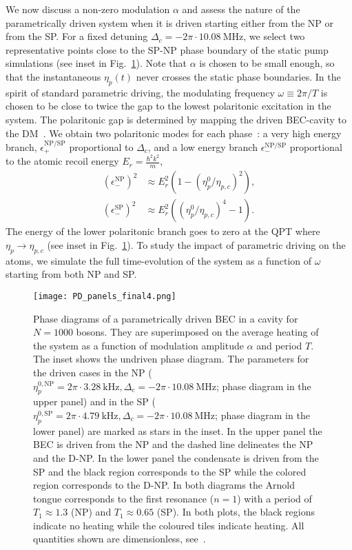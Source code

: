 \documentclass[aps,prl,twocolumn,superscriptaddress,groupedaddress]{revtex4}  %
\begin{document}
We now discuss a non-zero modulation $\alpha$ and assess the nature of the parametrically driven system when it is driven starting either from the NP or from the SP.
For a fixed detuning $\Delta_c=- 2\pi \cdot 10.08 \: \text{MHz}$, we select two representative points close to the SP-NP phase boundary of the static pump simulations (see inset in Fig.~\ref{PDs}). 
Note that $\alpha$ is chosen to be small enough, so that the instantaneous $\eta_p(t)$ never  crosses the  static phase boundaries.  In the spirit of standard parametric driving,
the modulating frequency $\omega\equiv 2\pi/T$ is  chosen to be close to twice the gap to the lowest polaritonic excitation in the system. 
The polaritonic gap is  determined by mapping the driven BEC-cavity to the DM~\cite{supmat}. 
We obtain two polaritonic  modes for each phase~\cite{Emary}: a very high energy branch, $\epsilon_{+}^{\textrm{NP/SP}}$ proportional to $\Delta_c$, and a low energy branch
$\epsilon_{-}^{\textrm{NP/SP}}$ proportional to the atomic recoil energy $E_r = \frac{\hbar^2 k^2}{m}$,
\begin{align}
(\epsilon_{-}^{\textrm{NP}})^2 & \approx E_r^2 \left( 1 - (\eta_p^0/\eta_{p, c})^2 \right) , \\
(\epsilon_{-}^{\textrm{SP}})^2 & \approx E_r^2 \left( (\eta_p^0/\eta_{p, c})^4 - 1 \right) .
\end{align}
The  energy of the lower polaritonic branch goes to zero at the QPT  where $\eta_p \to \eta_{p, c}$ (see  inset in Fig.~\ref{PDs}).  
To study the impact of parametric driving on the atoms, we simulate the full time-evolution of the system as a function of $\omega$ starting from both NP and SP. 
\begin{figure}[t]
\texttt{[image: PD\_panels\_final4.png]}%
\caption{Phase diagrams of a parametrically driven BEC in a cavity for $N=1000$ bosons. They are superimposed on the average heating of the system as a function of modulation amplitude 
$\alpha$ and period $T$. 
The inset shows the undriven phase diagram. The parameters for the driven cases in the NP ($\eta_p^{0,\textrm{NP}} = 2\pi \cdot 3.28 \: \text{kHz} , \Delta_c=- 2\pi \cdot 10.08 \: \text{MHz}$; phase 
diagram in the upper panel) and in the SP ($\eta_p^{0,\textrm{SP}} = 2\pi \cdot 4.79 \:  \text{kHz}, \Delta_c=- 2\pi \cdot 10.08 \: \text{MHz}$; phase diagram in the lower panel) are marked as stars 
in the inset.
In the upper panel the BEC is driven from the NP and the dashed line delineates the NP and the D-NP.  
In the lower panel the condensate is driven from the SP and the black region corresponds to the SP while the colored region corresponds to the D-NP. 
In both diagrams the Arnold tongue corresponds to the first resonance ($n=1$) with a period of $T_1 \approx 1.3$ (NP) and $T_1 \approx 0.65$ (SP). 
In both plots, the black regions indicate no heating while the coloured tiles indicate heating.  
All quantities shown are dimensionless, see~\cite{supmat}. }
\label{PDs}
\end{figure}
\end{document}
